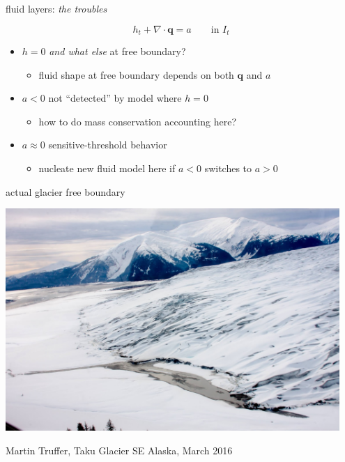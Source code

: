 \documentclass[xcolor={dvipsnames}]{beamer}
\newcommand\bq{\mathbf{q}}
\newcommand\Div{\nabla\cdot}
\begin{document}
\begin{frame}{fluid layers: \emph{the troubles}}

\vspace{-1.2mm}

\begin{center}
\end{center}

\vspace{-16mm}
$$h_t + \Div\bq = a \qquad \text{in } I_t$$

  \begin{itemize}
  \item<1-> $h=0$ \emph{and what else} at \alert<1>{free boundary}?
     \begin{itemize}
     \item<1->[$\circ$] fluid shape at free boundary depends on both $\bq$ and $a$
     \end{itemize}
  \item<2-> $a<0$ not ``detected'' by model where $h=0$
     \begin{itemize}
     \item<2->[$\circ$] how to do mass conservation accounting \alert<2>{here}?
     \end{itemize}
  \item<3> $a\approx 0$ sensitive-threshold behavior
     \begin{itemize}
     \item<3>[$\circ$] nucleate new fluid model \alert<3>{here} if $a<0$ switches to $a>0$
     \end{itemize}
  \end{itemize}
\end{frame}


\begin{frame}{actual glacier free boundary}

\begin{center}
\includegraphics[width=0.95\textwidth,keepaspectratio=true]{truffertaku2016}
\end{center}

\tiny \hfill Martin Truffer, Taku Glacier SE Alaska, March 2016
\end{frame}
\end{document}
